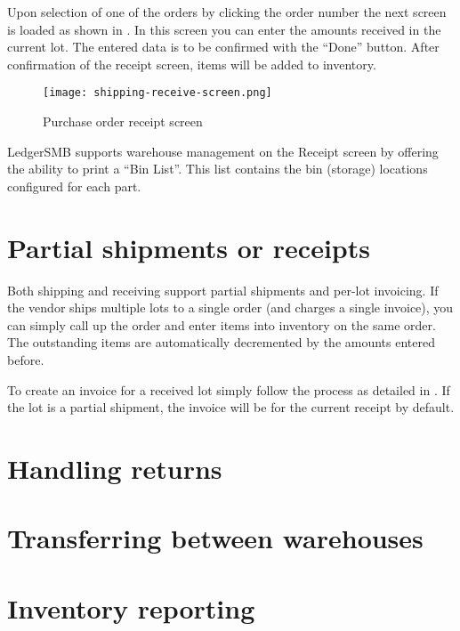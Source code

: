 Upon selection of one of the orders by clicking the order number the next screen is loaded
as shown in . In this screen you can enter the amounts
received in the current lot. The entered data is to be confirmed with the ``Done'' button.
After confirmation of the receipt screen, items will be added to inventory.

\begin{figure}[h]
\centering
\texttt{[image: shipping-receive-screen.png]}
\caption{Purchase order receipt screen}
\label{fig:shipping-receive-screen}
\end{figure}

LedgerSMB supports warehouse management on the Receipt screen by offering the ability to
print a ``Bin List''. This list contains the bin (storage) locations configured for each part.


\section{Partial shipments or receipts}
\label{sec-workflows-inventory-shipping-partial}

Both shipping and receiving support partial shipments and per-lot invoicing. If the vendor
ships multiple lots to a single order (and charges a single invoice), you can simply call
up the order and enter items into inventory on the same order. The outstanding items
are automatically decremented by the amounts entered before.

To create an invoice for a received lot simply follow the process as detailed in
. If the lot is a partial shipment, the invoice will be
for the current receipt by default.

\section{Handling returns}
\label{sec-workflows-inventory-shipping-returns}


\section{Transferring between warehouses}
\label{sec-workflows-inventory-warehouse-transfers}

\section{Inventory reporting}
\label{sec-workflows-inventory-reporting}


